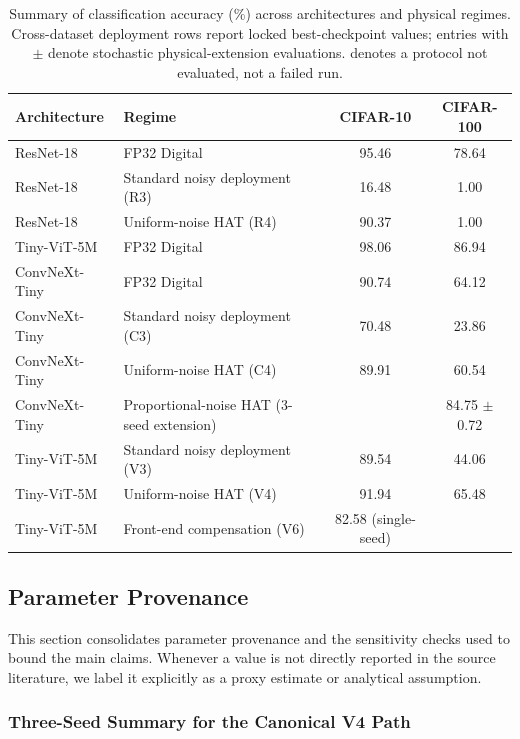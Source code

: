 \begin{table}[ht]
    \centering
    \caption{Summary of classification accuracy (\%) across architectures and physical regimes. Cross-dataset deployment rows report locked best-checkpoint values; entries with $\pm$ denote stochastic physical-extension evaluations. \notrun{} denotes a protocol not evaluated, not a failed run.}
    \label{tab:supp-result-summary}
    \small
    \begin{tabular}{llcc}
        \toprule
        \textbf{Architecture} & \textbf{Regime} & \textbf{CIFAR-10} & \textbf{CIFAR-100} \\
        \midrule
        ResNet-18 & FP32 Digital & 95.46 & 78.64 \\
        ResNet-18 & Standard noisy deployment (R3) & 16.48 & 1.00 \\
        ResNet-18 & Uniform-noise HAT (R4) & 90.37 & 1.00 \\
        Tiny-ViT-5M & FP32 Digital & 98.06 & 86.94 \\
        ConvNeXt-Tiny & FP32 Digital & 90.74 & 64.12 \\
        ConvNeXt-Tiny & Standard noisy deployment (C3) & 70.48 & 23.86 \\
        ConvNeXt-Tiny & Uniform-noise HAT (C4) & 89.91 & 60.54 \\
        ConvNeXt-Tiny & Proportional-noise HAT (3-seed extension) & \notrun{} & 84.75 $\pm$ 0.72 \\
        \midrule
        Tiny-ViT-5M & Standard noisy deployment (V3) & 89.54 & 44.06 \\
        Tiny-ViT-5M & Uniform-noise HAT (V4) & 91.94 & 65.48 \\
        Tiny-ViT-5M & Front-end compensation (V6) & 82.58 (single-seed) & \notrun{} \\
        \bottomrule
    \end{tabular}
\end{table}

\subsection{Parameter Provenance}
\label{subsec:parameter-provenance}

This section consolidates parameter provenance and the sensitivity checks used to bound the main claims. Whenever a value is not directly reported in the source literature, we label it explicitly as a proxy estimate or analytical assumption.

\subsubsection{Three-Seed Summary for the Canonical V4 Path}

